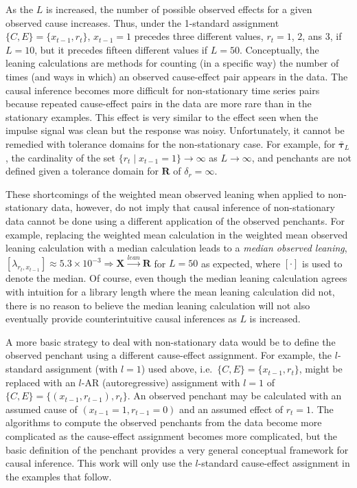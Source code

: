 \documentclass[a4paper,11pt,twocolumn]{article}
\begin{document}
As the $L$ is increased, the number of possible observed effects for a given observed cause increases.  Thus, under the 1-standard assignment $\{C,E\} = \{x_{t-1},r_t\}$, $x_{t-1}=1$ precedes three different values, $r_t = 1$, $2$, ans $3$, if $L=10$, but it precedes fifteen different values if $L=50$.  Conceptually, the leaning calculations are methods for counting (in a specific way) the number of times (and ways in which) an observed cause-effect pair appears in the data.  The causal inference becomes more difficult for non-stationary time series pairs because repeated cause-effect pairs in the data are more rare than in the stationary examples.  This effect is very similar to the effect seen when the impulse signal was clean but the response was noisy.  Unfortunately, it cannot be remedied with tolerance domains for the non-stationary case.  For example, for $\bar{\mathbf{\tau}}_L$, the cardinality of the set $\{r_t\;|\;x_{t-1}=1\}\rightarrow\infty$ as $L\rightarrow\infty$, and penchants are not defined given a tolerance domain for $\mathbf{R}$ of $\delta_r=\infty$.

These shortcomings of the weighted mean observed leaning when applied to non-stationary data, however, do not imply that causal inference of non-stationary data cannot be done using a different application of the observed penchants.  For example, replacing the weighted mean calculation in the weighted mean observed leaning calculation with a median calculation leads to a {\em median observed leaning}, $[\lambda_{r_t,x_{t-1}}] \approx 5.3\times 10^{-3}\Rightarrow \mathbf{X}\xrightarrow{lean}\mathbf{R}$ for $L=50$ as expected, where $[\cdot]$ is used to denote the median.  Of course, even though the median leaning calculation agrees with intuition for a library length where the mean leaning calculation did not, there is no reason to believe the median leaning calculation will not also eventually provide counterintuitive causal inferences as $L$ is increased.  

A more basic strategy to deal with non-stationary data would be to define the observed penchant using a different cause-effect assignment.  For example, the $l$-standard assignment (with $l=1$) used above, i.e.\ $\{C,E\}=\{x_{t-1},r_t\}$, might be replaced with an $l$-AR (autoregressive) assignment with $l=1$ of $\{C,E\}=\{(x_{t-1},r_{t-1}),r_t\}$.  An observed penchant may be calculated with an assumed cause of $(x_{t-1}=1,r_{t-1}=0)$ and an assumed effect of $r_t = 1$.  The algorithms to compute the observed penchants from the data become more complicated as the cause-effect assignment becomes more complicated, but the basic definition of the penchant provides a very general conceptual framework for causal inference.  This work will only use the $l$-standard cause-effect assignment in the examples that follow.
\end{document}
